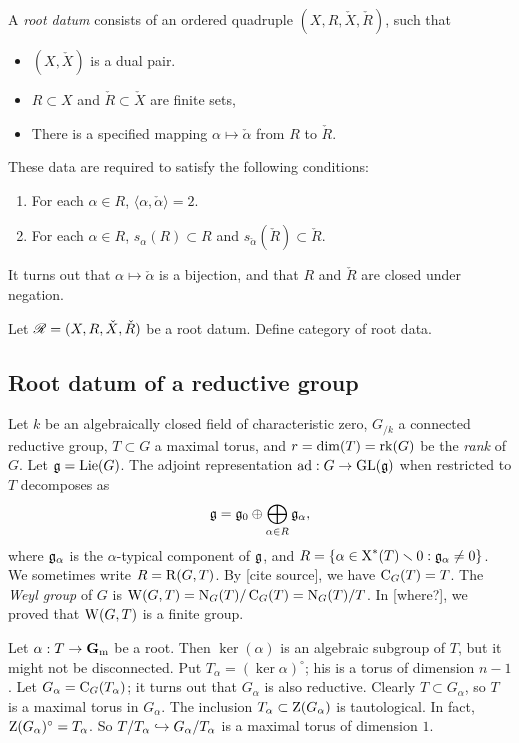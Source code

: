 \begin{definition}
A \emph{root datum} consists of an ordered quadruple $(X,R,\check X,\check R)$, 
such that 
\begin{itemize}
  \item $(X,\check X)$ is a dual pair. 
  \item $R\subset X$ and $\check R\subset \check X$ are finite sets, 
  \item There is a specified mapping $\alpha\mapsto \check\alpha$ from $R$ to 
    $\check R$. 
\end{itemize}
These data are required to satisfy the following conditions:
\begin{enumerate}
  \item For each $\alpha\in R$, $\langle\alpha,\check\alpha\rangle=2$. 
  \item For each $\alpha\in R$, $s_\alpha(R)\subset R$ and 
    $s_{\check\alpha}(\check R)\subset \check R$. 
\end{enumerate}
\end{definition}

It turns out that $\alpha\mapsto \check\alpha$ is a bijection, and that 
$R$ and $\check R$ are closed under negation. 

Let $\mathscr{R}=(X,R,\check X,\check R)$ be a root datum. Define category of 
root data. 





\subsection{Root datum of a reductive group}

Let $k$ be an algebraically closed field of characteristic zero, $G_{/k}$ a 
connected reductive group, $T\subset G$ a maximal torus, and 
$r=\dim(T)=\operatorname{rk}(G)$ be the \emph{rank} of $G$. Let $\mathfrak{g}=\operatorname{Lie}(G)$. The 
adjoint representation $\operatorname{ad}:G\to \operatorname{GL}(\mathfrak{g})$ when restricted to $T$ 
decomposes as 
\[
  \mathfrak{g} = \mathfrak{g}_0\oplus \bigoplus_{\alpha\in R} \mathfrak{g}_\alpha ,
\]
where $\mathfrak{g}_\alpha$ is the $\alpha$-typical component of $\mathfrak{g}$, and 
$R=\{\alpha\in \operatorname{X}^\ast(T)\smallsetminus 0:\mathfrak{g}_\alpha\ne 0\}$. We 
sometimes write $R=\operatorname{R}(G,T)$. By [cite source], we have 
$\operatorname{C}_G(T)=T$. The \emph{Weyl group} of $G$ is 
$\operatorname{W}(G,T) = \operatorname{N}_G(T)/\operatorname{C}_G(T) = \operatorname{N}_G(T)/T$. 
In [where?], we proved that $\operatorname{W}(G,T)$ is a finite group. 

Let $\alpha:T\to \mathbf{G}_\mathrm{m}$ be a root. Then $\ker(\alpha)$ is an algebraic 
subgroup of $T$, but it might not be disconnected. Put 
$T_\alpha=(\ker\alpha)^\circ$; his is a torus of dimension $n-1$. Let 
$G_\alpha=\operatorname{C}_G(T_\alpha)$; it turns out that $G_\alpha$ is also 
reductive. Clearly $T\subset G_\alpha$, so $T$ is a maximal torus in 
$G_\alpha$. The inclusion $T_\alpha\subset \operatorname{Z}(G_\alpha)$ is 
tautological. In fact, $\operatorname{Z}(G_\alpha)^\circ = T_\alpha$. So 
$T/T_\alpha\hookrightarrow G_\alpha/T_\alpha$ is a maximal torus of dimension $1$. 

